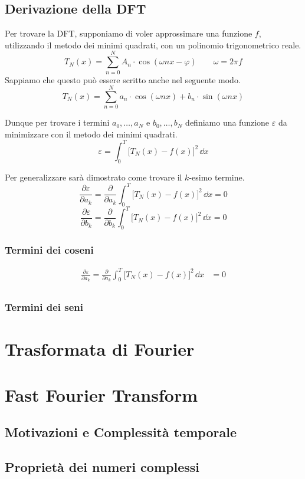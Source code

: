 \subsection{Derivazione della DFT}
Per trovare la DFT, supponiamo di voler approssimare una funzione \(f\),
utilizzando il metodo dei minimi quadrati, con un polinomio trigonometrico
reale.
\[
    T_N(x) =  \sum_{n=0}^N A_n\cdot\cos(\omega nx -\varphi) \qquad \omega=2\pi f
\]
Sappiamo che questo pu\`o essere scritto anche nel seguente modo.
\[
    T_N(x) =  \sum_{n=0}^N a_n\cdot\cos(\omega nx)  + b_n\cdot\sin(\omega nx)
\]

Dunque per trovare i termini \(a_0,\dots,a_N\) e \(b_0,\dots,b_N\) definiamo
una funzione \(\varepsilon\) da minimizzare con il metodo dei minimi quadrati.
\[
    \varepsilon = \int_0^T\big[T_N(x) - f(x)\big]^2\,\dd{x}
\]

Per generalizzare sar\`a dimostrato come trovare il \(k\)-esimo termine.
\[
    \frac{\partial\varepsilon}{\partial a_k} =
    \frac{\partial}{\partial a_k} \int_0^T\big[T_N(x) - f(x)\big]^2\,\dd{x}
    = 0
\]
\[
    \frac{\partial\varepsilon}{\partial b_k} =
    \frac{\partial}{\partial b_k} \int_0^T\big[T_N(x) - f(x)\big]^2\,\dd{x}
    = 0
\]

\subsubsection{Termini dei coseni}
\begin{align*}
    \frac{\partial\varepsilon}{\partial a_k} =
    \frac{\partial}{\partial a_k} \int_0^T\big[T_N(x) - f(x)\big]^2\,\dd{x}
    &= 0 \\
\end{align*}
\subsubsection{Termini dei seni}

\section{Trasformata di Fourier}

\section{Fast Fourier Transform}
\subsection{Motivazioni e Complessit\`a temporale}
\subsection{Propriet\`a dei numeri complessi}


